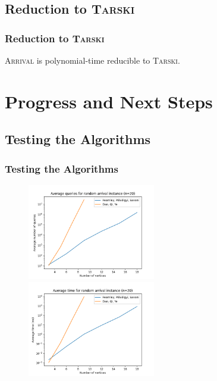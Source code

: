 \documentclass{beamer}
\begin{document}
\subsection{Reduction to \textsc{Tarski}}
\begin{frame}
\frametitle{Reduction to \textsc{Tarski}}
    \begin{Theorem}
        \textsc{Arrival} is polynomial-time reducible to \textsc{Tarski}.
    \end{Theorem}
\end{frame}


\section{Progress and Next Steps}
\subsection{Testing the Algorithms}
\begin{frame}
\frametitle{Testing the Algorithms}
    \begin{figure}[t]
        \centering
        \includegraphics[width=2.2in]{avQueries.png}
        \centering
        \includegraphics[width=2.2in]{avTime.png}
    \end{figure}
\end{frame}
\end{document}
